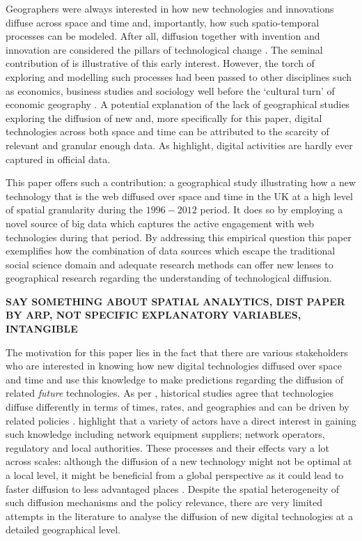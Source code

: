\documentclass[
  authoryear,
  preprint,
  3p]{elsarticle}
\begin{document}
Geographers were always interested in how new technologies and
innovations diffuse across space and time and, importantly, how such
spatio-temporal processes can be modeled. After all, diffusion together
with invention and innovation are considered the pillars of
technological change \citep{das2022diffusion}. The seminal contribution
of \citet{hagerstrand1968innovation} is illustrative of this early
interest. However, the torch of exploring and modelling such processes
had been passed to other disciplines such as economics, business studies
and sociology well before the `cultural turn' of economic geography
\citep{perkins2005international}. A potential explanation of the lack of
geographical studies exploring the diffusion of new and, more
specifically for this paper, digital technologies across both space and
time can be attributed to the scarcity of relevant and granular enough
data. As \citet{zook2022mapping} highlight, digital activities are
hardly ever captured in official data.

This paper offers such a contribution: a geographical study illustrating
how a new technology that is the web diffused over space and time in the
UK at a high level of spatial granularity during the \(1996-2012\)
period. It does so by employing a novel source of big data which
captures the active engagement with web technologies during that period.
By addressing this empirical question this paper exemplifies how the
combination of data sources which escape the traditional social science
domain and adequate research methods can offer new lenses to
geographical research regarding the understanding of technological
diffusion.

\textbf{SAY SOMETHING ABOUT SPATIAL ANALYTICS, DIST PAPER BY ARP, NOT
SPECIFIC EXPLANATORY VARIABLES, INTANGIBLE}

The motivation for this paper lies in the fact that there are various
stakeholders who are interested in knowing how new digital technologies
diffused over space and time and use this knowledge to make predictions
regarding the diffusion of related \emph{future} technologies. As per
\citet{leibowicz2016representing}, historical studies agree that
technologies diffuse differently in terms of times, rates, and
geographies and can be driven by related policies \citep{victor1993}.
\citet{meade2021modelling} highlight that a variety of actors have a
direct interest in gaining such knowledge including network equipment
suppliers; network operators, regulatory and local authorities. These
processes and their effects vary a lot across scales: although the
diffusion of a new technology might not be optimal at a local level, it
might be beneficial from a global perspective as it could lead to faster
diffusion to less advantaged places \citep{leibowicz2016representing}.
Despite the spatial heterogeneity of such diffusion mechanisms and the
policy relevance, there are very limited attempts in the literature to
analyse the diffusion of new digital technologies at a detailed
geographical level.
\end{document}
